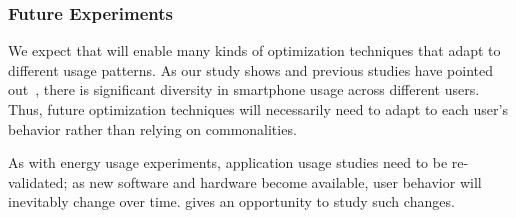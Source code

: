 \subsubsection{Future Experiments}

We expect that \PhoneLab{} will enable many kinds of optimization techniques
that adapt to different usage patterns. As our study shows and previous studies
have pointed out~\cite{falaki:mobisys:2010, shye:micro:2009}, there is
significant diversity in smartphone usage across different users. Thus, future
optimization techniques will necessarily need to adapt to each user's behavior
rather than relying on commonalities.

As with energy usage experiments, application usage studies need to be
re-validated; as new software and hardware become available, user behavior will
inevitably change over time. \PhoneLab{} gives an opportunity to study such
changes.
